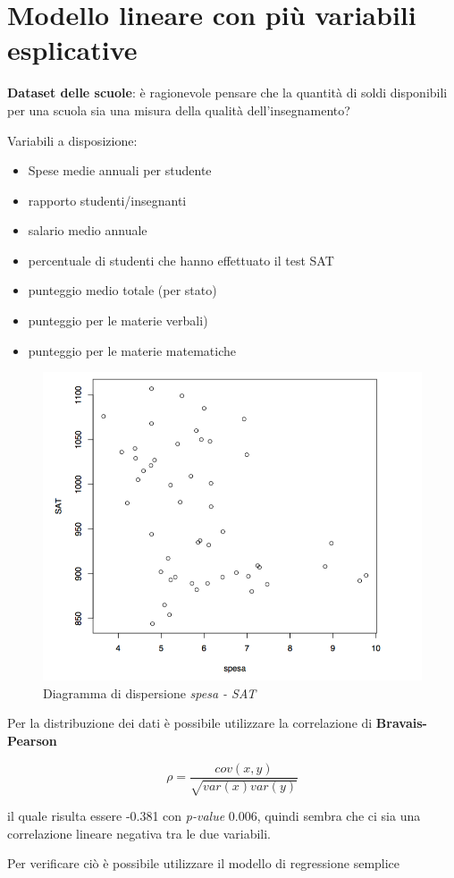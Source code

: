 \chapter{Modello lineare con più variabili esplicative}

\textbf{Dataset delle scuole}: è ragionevole pensare che la quantità di
soldi disponibili per una scuola sia una misura della qualità
dell'insegnamento?

Variabili a disposizione:

\begin{itemize}
\item
  Spese medie annuali per studente
\item
  rapporto studenti/insegnanti
\item
  salario medio annuale
\item
  percentuale di studenti che hanno effettuato il test SAT
\item
  punteggio medio totale (per stato)
\item
  punteggio per le materie verbali)
\item
  punteggio per le materie matematiche
\end{itemize}

\begin{figure}[htbp]
	\centering
	\includegraphics[width=.5\textwidth]{./notes/immagini/l8-fig4.png}
	\caption{Diagramma di dispersione \textit{spesa - SAT}}
\end{figure}

Per la distribuzione dei dati è possibile utilizzare la correlazione di \textbf{Bravais-Pearson}

$$
\rho = \frac{cov(x,y)}{\sqrt{var(x)var(y)}}
$$

il quale risulta essere -0.381 con \textit{p-value} 0.006, quindi sembra che ci sia una correlazione lineare negativa tra le due variabili.

Per verificare ciò è possibile utilizzare il modello di regressione semplice

